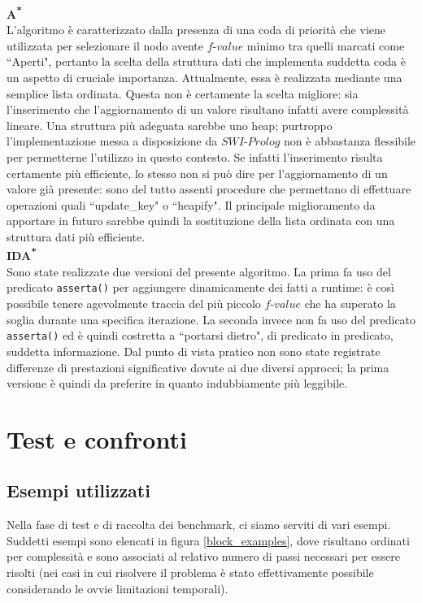 \noindent\textbf{\textbf{A\textsuperscript{*}}}\\
L'algoritmo è caratterizzato dalla presenza di una coda di priorità che viene utilizzata per selezionare il nodo avente $f$-$value$ minimo tra quelli marcati come ``Aperti", pertanto la scelta della struttura dati che implementa suddetta coda è un aspetto di cruciale importanza. Attualmente, essa è realizzata mediante una semplice lista ordinata. Questa non è certamente la scelta migliore: sia l'inserimento che l'aggiornamento di un valore risultano infatti avere complessità lineare. Una struttura più adeguata sarebbe uno heap; purtroppo l'implementazione messa a disposizione da $SWI$-$Prolog$ non è abbastanza flessibile per permetterne l'utilizzo in questo contesto. Se infatti l'inserimento risulta certamente più efficiente, lo stesso non si può dire per l'aggiornamento di un valore già presente: sono del tutto assenti procedure che permettano di effettuare operazioni quali ``update\_key" o ``heapify". Il principale miglioramento da apportare in futuro sarebbe quindi la sostituzione della lista ordinata con una struttura dati più efficiente. \\

\noindent\textbf{\textbf{IDA\textsuperscript{*}}}\\
Sono state realizzate due versioni del presente algoritmo. La prima fa uso del predicato \texttt{asserta()} per aggiungere dinamicamente dei fatti a runtime: è così possibile tenere agevolmente traccia del più piccolo $f$-$value$ che ha superato la soglia durante una specifica iterazione. La seconda invece non fa uso del predicato \texttt{asserta()} ed è quindi costretta a ``portarsi dietro", di predicato in predicato, suddetta informazione. Dal punto di vista pratico non sono state registrate differenze di prestazioni significative dovute ai due diversi approcci; la prima versione è quindi da preferire in quanto indubbiamente più leggibile.

\section{Test e confronti}

\subsection{Esempi utilizzati} 
Nella fase di test e di raccolta dei benchmark, ci siamo serviti di vari esempi. Suddetti esempi sono elencati in figura \ref{block_examples}, dove risultano ordinati per complessità e sono associati al relativo numero di passi necessari per essere risolti (nei casi in cui risolvere il problema è stato effettivamente possibile considerando le ovvie limitazioni temporali). 

